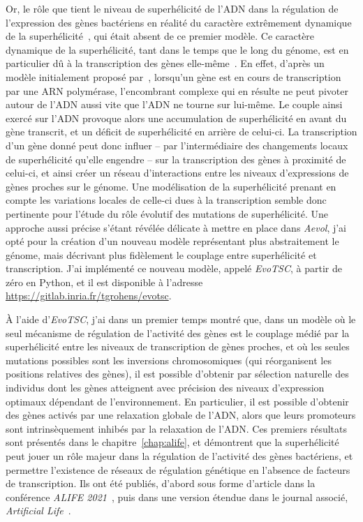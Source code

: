 Or, le rôle que tient le niveau de superhélicité de l'ADN dans la régulation de l'expression des gènes bactériens en réalité du caractère extrêmement dynamique de la superhélicité~\citep{martisb.2019}, qui était absent de ce premier modèle.
Ce caractère dynamique de la superhélicité, tant dans le temps que le long du génome, est en particulier dû à la transcription des gènes elle-même~\citep{visser2022}.
En effet, d'après un modèle initialement proposé par~\cite{liu1987}, lorsqu'un gène est en cours de transcription par une ARN polymérase, l'encombrant complexe qui en résulte ne peut pivoter autour de l'ADN aussi vite que l'ADN ne tourne sur lui-même.
Le couple ainsi exercé sur l'ADN provoque alors une accumulation de superhélicité en avant du gène transcrit, et un déficit de superhélicité en arrière de celui-ci.
La transcription d'un gène donné peut donc influer -- par l'intermédiaire des changements locaux de superhélicité qu'elle engendre -- sur la transcription des gènes à proximité de celui-ci, et ainsi créer un réseau d'interactions entre les niveaux d'expressions de gènes proches sur le génome.
Une modélisation de la superhélicité prenant en compte les variations locales de celle-ci dues à la transcription semble donc pertinente pour l'étude du rôle évolutif des mutations de superhélicité.
Une approche aussi précise s'étant révélée délicate à mettre en place dans \emph{Aevol}, j'ai opté pour la création d'un nouveau modèle représentant plus abstraitement le génome, mais décrivant plus fidèlement le couplage entre superhélicité et transcription.
J'ai implémenté ce nouveau modèle, appelé \emph{EvoTSC}, à partir de zéro en Python, et il est disponible à l'adresse \url{https://gitlab.inria.fr/tgrohens/evotsc}.

À l'aide d'\emph{EvoTSC}, j'ai dans un premier temps montré que, dans un modèle où le seul mécanisme de régulation de l'activité des gènes est le couplage médié par la superhélicité entre les niveaux de transcription de gènes proches, et où les seules mutations possibles sont les inversions chromosomiques (qui réorganisent les positions relatives des gènes), il est possible d'obtenir par sélection naturelle des individus dont les gènes atteignent avec précision des niveaux d'expression optimaux dépendant de l'environnement.
En particulier, il est possible d'obtenir des gènes activés par une relaxation globale de l'ADN, alors que leurs promoteurs sont intrinsèquement inhibés par la relaxation de l'ADN.
Ces premiers résultats sont présentés dans le chapitre~\ref{chap:alife}, et démontrent que la superhélicité peut jouer un rôle majeur dans la régulation de l'activité des gènes bactériens, et permettre l'existence de réseaux de régulation génétique en l'absence de facteurs de transcription.
Ils ont été publiés, d'abord sous forme d'article dans la conférence \emph{ALIFE 2021}~\citep{grohens2021}, puis dans une version étendue dans le journal associé, \emph{Artificial Life}~\citep{grohens2022a}.

